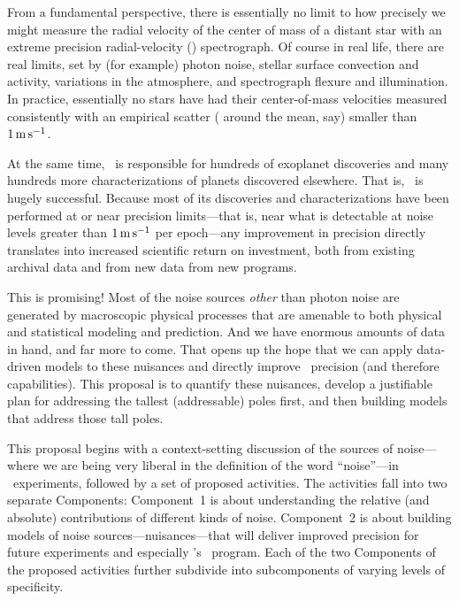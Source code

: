 \documentclass[12pt, fullpage, letterpaper]{article}
\begin{document}
\noindent
From a fundamental perspective, there is essentially no limit to how
precisely we might measure the radial velocity of the center of mass
of a distant star with an extreme precision radial-velocity (\EPRV) spectrograph.
Of course in real life, there are real limits, set
by (for example) photon noise, stellar surface convection and activity,
variations in the atmosphere, and spectrograph flexure and illumination. In practice,
essentially no stars have had their center-of-mass velocities measured
consistently with an empirical scatter ( around the mean,
say) smaller than $1\,{\mathrm{m\,s^{-1}}}$.

At the same time, \EPRV\ is responsible for hundreds of 
exoplanet discoveries and many hundreds more 
characterizations of planets
discovered elsewhere. That is, \EPRV\ is hugely successful.
Because most of its discoveries and characterizations have been performed
at or near precision limits---that is, near what is detectable at noise levels
greater than $1\,{\mathrm{m\,s^{-1}}}$ per epoch---any improvement in precision directly
translates into increased scientific return on investment,
both from existing archival data and from new data from new programs.

This is promising! Most of the noise sources \emph{other} than photon noise
are generated by macroscopic physical processes that are amenable to both
physical and statistical modeling and prediction. And we have enormous amounts
of data in hand, and far more to come. That opens up the hope
that we can apply data-driven models to these nuisances and directly improve
\EPRV\ precision (and therefore capabilities). This proposal is to quantify
these nuisances, develop a justifiable plan for addressing the tallest
(addressable) poles first, and then building models that address those tall
poles.

This proposal begins with a context-setting discussion of the sources
of noise---where we are being very liberal in the definition of the
word ``noise''---in \EPRV\ experiments,
followed by a set of proposed activities. The activities fall into two
separate Components: Component~1 is about understanding the relative
(and absolute) contributions of different kinds of noise. Component~2
is about building models of noise sources---nuisances---that will
deliver improved precision for future experiments and especially \NASA's
\NNEXPLORE\ program. Each of the two Components of the proposed activities
further subdivide into subcomponents of varying levels of specificity.
\end{document}
